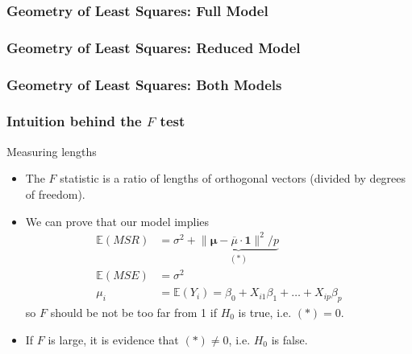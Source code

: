 \documentclass[handout]{beamer}
\newcommand{\Ee}{\mathbb{E}}
\begin{document}

   \begin{frame} \frametitle{Geometry of Least Squares: Full Model}

   \end{frame}


   \begin{frame} \frametitle{Geometry of Least Squares: Reduced Model}

   \end{frame}


   \begin{frame} \frametitle{Geometry of Least Squares: Both Models}

   \end{frame}


   \begin{frame} \frametitle{Intuition behind the $F$ test}

   \begin{block}
   {Measuring lengths}
   \begin{itemize}
   \item The $F$ statistic is a ratio of lengths of orthogonal vectors (divided by degrees of freedom).

   \item We can prove that our model implies
   $$
   \begin{aligned}
   \Ee \left(MSR\right) &= \sigma^2 + \underbrace{\|\pmb{\mu} - \overline{\mu} \cdot \pmb{1}\|^2 / p}_{(*)} \\
   \Ee \left(MSE\right) &= \sigma^2 \\
   \mu_i &= \Ee(Y_i) = \beta_0 + X_{i1} \beta_1  + \dots +  X_{ip} \beta_p
   \end{aligned}
   $$
   so $F$ should be not be too far from 1 if $H_0$ is true, i.e. $(*)=0$.


   \item If $F$ is large, it is evidence that $(*) \neq 0$, i.e. $H_0$ is false.
   \end{itemize}
   \end{block}
   \end{frame}
\end{document}
